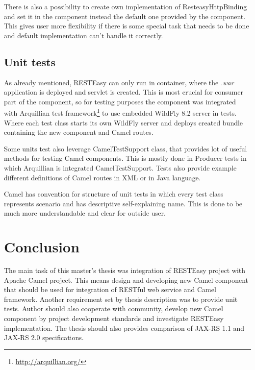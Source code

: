 \documentclass[12pt,final,oneside]{fithesis2}
\begin{document}
There is also a possibility to create own implementation of ResteasyHttpBinding and set it in the component instead the default one provided by the component. This gives user more flexibility if there is some special task that needs to be done and default implementation can't handle it correctly.  

\section{Unit tests}
As already mentioned, RESTEasy can only run in container, where the \textit{.war} application is deployed and servlet is created. This is most crucial for consumer part of the component, so for testing purposes the component was integrated with Arquillian test framework\footnote{\url{http://arquillian.org/}} to use embedded WildFly 8.2 server in tests. Where each test class starts its own WildFly server and deploys created bundle containing the new component and Camel routes.  

Some units test also leverage CamelTestSupport class, that provides lot of useful methods for testing Camel components. This is mostly done in Producer tests in which Arquillian is integrated CamelTestSupport. Tests also provide example different definitions of Camel routes in XML or in Java language.

Camel has convention for structure of unit tests in which every test class represents scenario and has descriptive self-explaining name. This is done to be much more understandable and clear for outside user. 


\chapter{Conclusion}
The main task of this master's thesis was integration of RESTEasy project with Apache Camel project. This means design and developing new Camel component that should be used for integration of RESTful web service and Camel framework. Another requirement set by thesis description was to provide unit tests. Author should also cooperate with community, develop new Camel component by project development standards and investigate RESTEasy implementation. The thesis should also provides comparison of JAX-RS 1.1 and JAX-RS 2.0 specifications.
\end{document}
